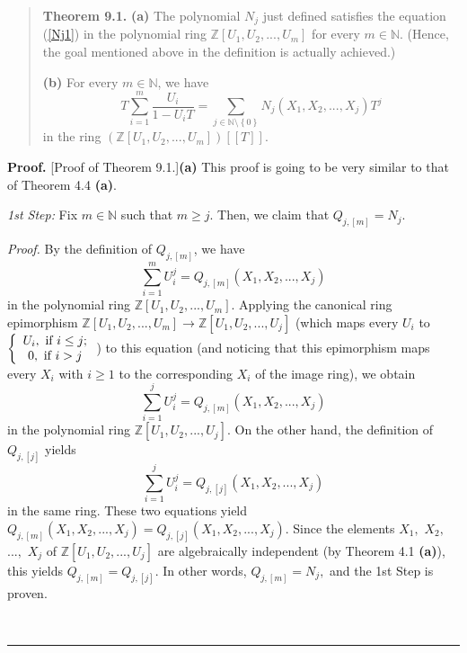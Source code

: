 \documentclass[numbers=enddot,12pt,final,onecolumn,notitlepage]{scrartcl}%
\newenvironment{proof}[1][Proof]{\noindent\textbf{#1.} }{\ \rule{0.5em}{0.5em}}
\begin{document}
\begin{quote}
\textbf{Theorem 9.1.} \textbf{(a)} The polynomial $N_{j}$ just defined
satisfies the equation (\ref{Nj1}) in the polynomial ring $\mathbb{Z}\left[
U_{1},U_{2},...,U_{m}\right]  $ for every $m\in\mathbb{N}$. (Hence, the goal
mentioned above in the definition is actually achieved.)

\textbf{(b)} For every $m\in\mathbb{N}$, we have%
\begin{equation}
T\sum_{i=1}^{m}\dfrac{U_{i}}{1-U_{i}T}=\sum_{j\in\mathbb{N}\setminus\left\{
0\right\}  }N_{j}\left(  X_{1},X_{2},...,X_{j}\right)  T^{j} \label{Nj2}%
\end{equation}
in the ring $\left(  \mathbb{Z}\left[  U_{1},U_{2},...,U_{m}\right]  \right)
\left[  \left[  T\right]  \right]  $.
\end{quote}

\begin{proof}
[Proof of Theorem 9.1.]\textbf{(a)} This proof is going to be very similar to
that of Theorem 4.4 \textbf{(a)}.

\textit{1st Step:} Fix $m\in\mathbb{N}$ such that $m\geq j$. Then, we claim
that $Q_{j,\left[  m\right]  }=N_{j}$.

\textit{Proof.} By the definition of $Q_{j,\left[  m\right]  }$, we have%
\[
\sum_{i=1}^{m}U_{i}^{j}=Q_{j,\left[  m\right]  }\left(  X_{1},X_{2}%
,...,X_{j}\right)
\]
in the polynomial ring $\mathbb{Z}\left[  U_{1},U_{2},...,U_{m}\right]  $.
Applying the canonical ring epimorphism $\mathbb{Z}\left[  U_{1}%
,U_{2},...,U_{m}\right]  \rightarrow\mathbb{Z}\left[  U_{1},U_{2}%
,...,U_{j}\right]  $ (which maps every $U_{i}$ to $\left\{
\begin{array}
[c]{c}%
U_{i},\text{ if }i\leq j;\\
0,\text{ if }i>j
\end{array}
\right.  $) to this equation (and noticing that this epimorphism maps every
$X_{i}$ with $i\geq1$ to the corresponding $X_{i}$ of the image ring), we
obtain%
\[
\sum_{i=1}^{j}U_{i}^{j}=Q_{j,\left[  m\right]  }\left(  X_{1},X_{2}%
,...,X_{j}\right)
\]
in the polynomial ring $\mathbb{Z}\left[  U_{1},U_{2},...,U_{j}\right]  $. On
the other hand, the definition of $Q_{j,\left[  j\right]  }$ yields%
\[
\sum_{i=1}^{j}U_{i}^{j}=Q_{j,\left[  j\right]  }\left(  X_{1},X_{2}%
,...,X_{j}\right)
\]
in the same ring. These two equations yield $Q_{j,\left[  m\right]  }\left(
X_{1},X_{2},...,X_{j}\right)  =Q_{j,\left[  j\right]  }\left(  X_{1}%
,X_{2},...,X_{j}\right)  $. Since the elements $X_{1},$ $X_{2},$ $...,$
$X_{j}$ of $\mathbb{Z}\left[  U_{1},U_{2},...,U_{j}\right]  $ are
algebraically independent (by Theorem 4.1 \textbf{(a)}), this yields
$Q_{j,\left[  m\right]  }=Q_{j,\left[  j\right]  }.$ In other words,
$Q_{j,\left[  m\right]  }=N_{j},$ and the 1st Step is proven.


\end{proof}
\end{document}
